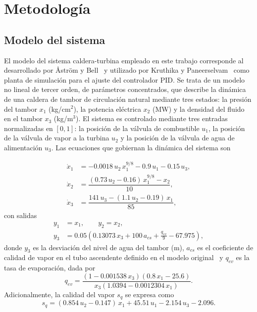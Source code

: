 \documentclass[final,5p,times,twocolumn,authoryear,11pt]{elsarticle}
\begin{document}
\section{Metodología}
\label{metodologia}

\subsection{Modelo del sistema}

El modelo del sistema caldera-turbina empleado en este trabajo corresponde al desarrollado por Åström y Bell~\citep{astrom2000drum} y utilizado por Kruthika y Paneerselvam~\citep{kruthika2025novel} como planta de simulación para el ajuste del controlador PID. Se trata de un modelo no lineal de tercer orden, de parámetros concentrados, que describe la dinámica de una caldera de tambor de circulación natural mediante tres estados: la presión del tambor $x_1$ (kg/cm$^2$), la potencia eléctrica $x_2$ (MW) y la densidad del fluido en el tambor $x_3$ (kg/m$^3$). El sistema es controlado mediante tres entradas normalizadas en $[0,1]$: la posición de la válvula de combustible $u_1$, la posición de la válvula de vapor a la turbina $u_2$ y la posición de la válvula de agua de alimentación $u_3$. Las ecuaciones que gobiernan la dinámica del sistema son

\begin{align}
\dot{x}_1 &= -0.0018\,u_2\,x_1^{9/8} - 0.9\,u_1 - 0.15\,u_3, \label{eq:x1} \\[2pt]
\dot{x}_2 &= \dfrac{(0.73\,u_2 - 0.16)\,x_1^{9/8} - x_2}{10}, \label{eq:x2} \\[2pt]
\dot{x}_3 &= \dfrac{141\,u_3 - (1.1\,u_2 - 0.19)\,x_1}{85}, \label{eq:x3}
\end{align}
con salidas
\begin{align}
y_1 &= x_1, \qquad y_2 = x_2, \label{eq:y1y2} \\[2pt]
y_3 &= 0.05\left(0.13073\,x_3 + 100\,a_{cs} + \frac{q_{ev}}{9} - 67.975\right), \label{eq:y3}
\end{align}
donde $y_3$ es la desviación del nivel de agua del tambor (m), $a_{cs}$ es el coeficiente de calidad de vapor en el tubo ascendente definido en el modelo original~\citep{astrom2000drum} y $q_{ev}$ es la tasa de evaporación, dada por
\begin{equation}
q_{ev} = \frac{(1-0.001538\,x_3)(0.8\,x_1 - 25.6)}{x_3(1.0394 - 0.0012304\,x_1)}. \label{eq:qev}
\end{equation}
Adicionalmente, la calidad del vapor $s_q$ se expresa como
\begin{equation}
s_q = (0.854\,u_2 - 0.147)\,x_1 + 45.51\,u_1 - 2.154\,u_3 - 2.096. \label{eq:sq}
\end{equation}
\end{document}
